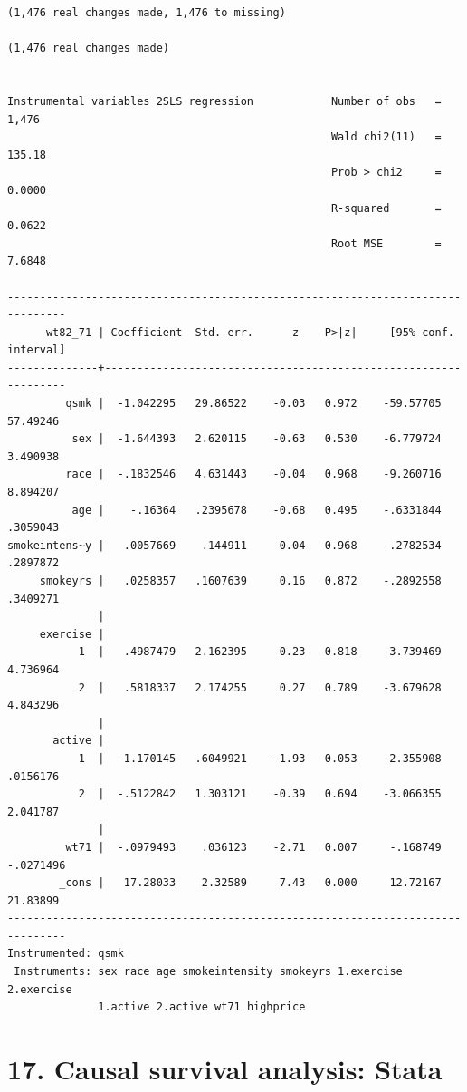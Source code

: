 \documentclass[
  10pt,
]{book}
\begin{document}
\begin{verbatim}
(1,476 real changes made, 1,476 to missing)

(1,476 real changes made)


Instrumental variables 2SLS regression            Number of obs   =      1,476
                                                  Wald chi2(11)   =     135.18
                                                  Prob > chi2     =     0.0000
                                                  R-squared       =     0.0622
                                                  Root MSE        =     7.6848

-------------------------------------------------------------------------------
      wt82_71 | Coefficient  Std. err.      z    P>|z|     [95% conf. interval]
--------------+----------------------------------------------------------------
         qsmk |  -1.042295   29.86522    -0.03   0.972    -59.57705    57.49246
          sex |  -1.644393   2.620115    -0.63   0.530    -6.779724    3.490938
         race |  -.1832546   4.631443    -0.04   0.968    -9.260716    8.894207
          age |    -.16364   .2395678    -0.68   0.495    -.6331844    .3059043
smokeintens~y |   .0057669    .144911     0.04   0.968    -.2782534    .2897872
     smokeyrs |   .0258357   .1607639     0.16   0.872    -.2892558    .3409271
              |
     exercise |
           1  |   .4987479   2.162395     0.23   0.818    -3.739469    4.736964
           2  |   .5818337   2.174255     0.27   0.789    -3.679628    4.843296
              |
       active |
           1  |  -1.170145   .6049921    -1.93   0.053    -2.355908    .0156176
           2  |  -.5122842   1.303121    -0.39   0.694    -3.066355    2.041787
              |
         wt71 |  -.0979493    .036123    -2.71   0.007     -.168749   -.0271496
        _cons |   17.28033    2.32589     7.43   0.000     12.72167    21.83899
-------------------------------------------------------------------------------
Instrumented: qsmk
 Instruments: sex race age smokeintensity smokeyrs 1.exercise 2.exercise
              1.active 2.active wt71 highprice
\end{verbatim}

\hypertarget{causal-survival-analysis-stata}{%
\chapter*{17. Causal survival analysis: Stata}\label{causal-survival-analysis-stata}}
\end{document}

